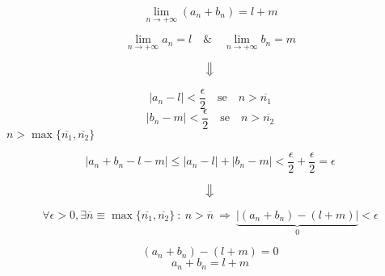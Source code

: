 \documentclass[../rip.tex]{subfiles}
\begin{document}
\begin{dimo}

\begin{equation}
	\lim \limits_{n \to +\infty} (a_n + b_n) = l + m
\end{equation}

\begin{equation}
	\lim \limits_{n \to +\infty} a_n = l \quad \& \quad
	\lim \limits_{n \to +\infty} b_n = m
\end{equation}

\begin{equation*}
	\big\Downarrow
\end{equation*}

\begin{equation}
	| a_n - l | < \frac{\epsilon}{2} \quad \mbox{se}\quad  n > \overline{n_1}
\end{equation}
\begin{equation}
	| b_n - m | < \frac{\epsilon}{2} \quad \mbox{se}\quad  n > \overline{n_2}
\end{equation}
$n> \max\{ \overline{n_1}, \overline{n_2} \}$

\begin{equation}
	| a_n + b_n - l - m | \leq | a_n - l | + | b_n - m | < 
	\frac{\epsilon}{2} + \frac{\epsilon}{2} = \epsilon
\end{equation}

\begin{equation*}
	\big\Downarrow
\end{equation*}

\begin{equation}
	\forall \epsilon > 0, \exists \overline{n} \equiv \max \{
	\overline{n_1}, \overline{n_2} \} \ :\ n > \overline{n}\ 
	\Rightarrow\ \underbrace{| (a_n + b_n) - ( l + m ) |}_{0} < \epsilon
\end{equation}

\begin{equation}
	( a_n + b_n ) - ( l + m ) = 0
\end{equation}
\begin{equation}
	a_n + b_n = l + m
\end{equation}

\end{dimo}
\end{document}
